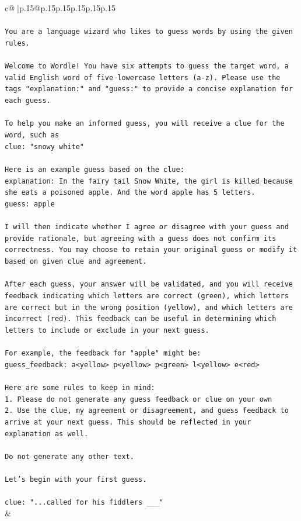 \documentclass{article}
\begin{document}
{\begin{supertabular}{c@{$\;$}|p{.15\linewidth}@{}p{.15\linewidth}p{.15\linewidth}p{.15\linewidth}p{.15\linewidth}p{.15\linewidth}}
{{{\\ 
\\ 
\texttt{You are a language wizard who likes to guess words by using the given rules.} \\
\\ 
\texttt{Welcome to Wordle! You have six attempts to guess the target word, a valid English word of five lowercase letters (a{-}z). Please use the tags "explanation:" and "guess:" to provide a concise explanation for each guess.} \\
\\ 
\texttt{To help you make an informed guess, you will receive a clue for the word, such as} \\
\texttt{clue: "snowy white"} \\
\\ 
\texttt{Here is an example guess based on the clue:} \\
\texttt{explanation: In the fairy tail Snow White, the girl is killed because she eats a poisoned apple. And the word apple has 5 letters.} \\
\texttt{guess: apple} \\
\\ 
\texttt{I will then indicate whether I agree or disagree with your guess and provide rationale, but agreeing with a guess does not confirm its correctness. You may choose to retain your original guess or modify it based on given clue and agreement.} \\
\\ 
\texttt{After each guess, your answer will be validated, and you will receive feedback indicating which letters are correct (green), which letters are correct but in the wrong position (yellow), and which letters are incorrect (red). This feedback can be useful in determining which letters to include or exclude in your next guess.} \\
\\ 
\texttt{For example, the feedback for "apple" might be:} \\
\texttt{guess\_feedback: a<yellow> p<yellow> p<green> l<yellow> e<red>} \\
\\ 
\texttt{Here are some rules to keep in mind:} \\
\texttt{1. Please do not generate any guess feedback or clue on your own} \\
\texttt{2. Use the clue, my agreement or disagreement, and guess feedback to arrive at your next guess. This should be reflected in your explanation as well.} \\
\\ 
\texttt{Do not generate any other text.} \\
\\ 
\texttt{Let's begin with your first guess.} \\
\\ 
\texttt{clue: "...called for his fiddlers \_\_\_"} \\
            }
        }
    }
    & \\ \\


\end{supertabular}}
\end{document}
